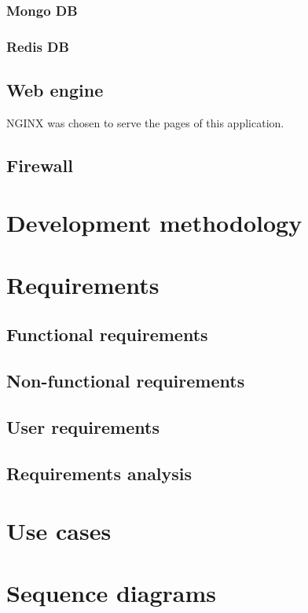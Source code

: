 \subsubsection{Mongo DB}

\subsubsection{Redis DB}

\subsection{Web engine}
NGINX was chosen to serve the pages of this application.

\subsection{Firewall}

\section{Development methodology}

\section{Requirements}

\subsection{Functional requirements}

\subsection{Non-functional requirements}

\subsection{User requirements}

\subsection{Requirements analysis}

\section{Use cases}

\section{Sequence diagrams}

